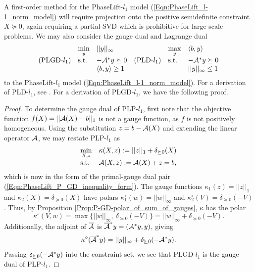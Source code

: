 A first-order method for the PhaseLift-$l_1$ model (\ref{Eqn:PhaseLift_l-1_norm_model}) will require projection onto the positive semidefinite constraint $X \succeq 0$, again requiring a partial SVD which is prohibitive for large-scale problems.  We may also consider the gauge dual and Lagrange dual
\begin{equation} 			\label{Eqn:PhaseLift_l-1_norm_model_dual}
\begin{array}{llllll}

	&	\min\limits_{y}
		&	||y||_\infty
			&&	\max\limits_y
				& \langle b, y \rangle
					\\
			
(\textnormal{PLGD-}l_1)		

	&	\textnormal{s.t.}
		&	-{\mathcal A}^*y \succeq 0
			&(\textnormal{PLD-}l_1)&	\textnormal{s.t.}
				&	- {\mathcal A}^*y \succeq 0
					\\
			
			&&	\langle b, y \rangle \geq 1 &&&	||y||_\infty \leq 1
\end{array}
\end{equation}
to the PhaseLift-$l_1$ model (\ref{Eqn:PhaseLift_l-1_norm_model}).
For a derivation of PLD-$l_1$, see \cite[Chapter 5]{boyd2004convex}.  For a derivation of PLGD-$l_1$, we have the following proof.

\begin{proof}
To determine the gauge dual of PLP-$l_1$, first note that the objective function $f(X) = ||{\mathcal A}(X) - b||_1$ is not a gauge function, as $f$ is not positively homogeneous.  Using the substitution $z = b - {\mathcal A}(X)$ and extending the linear operator ${\mathcal A}$, we may restate PLP-$l_1$ as
\begin{equation} 		\label{Eqn:PhaseLift_l-1_norm_model_general}
\begin{array}{ll}
\min\limits_{X, z}
	&	\kappa(X, z) := ||z||_1 + \delta_{\succeq 0}(X)
		\\
\textnormal{s.t.}
	&	\overline{{\mathcal A}}(X, z) := {\mathcal A}(X) + z = b,
\end{array}
\end{equation}
which is now in the form of the primal-gauge dual pair (\ref{Eqn:PhaseLift_P_GD_inequality_form}).  The gauge functions $\kappa_1(z) = ||z||_1$ and $\kappa_2(X) = \delta_{\succeq 0}(X)$ have polars $\kappa_1^\circ(w) = ||w||_\infty$ and $\kappa_2^\circ(V) = \delta_{\succeq 0}(-V)$.  Thus, by Proposition \ref{Prop:P-GD-polar_of_sum_of_gauges}, $\kappa$ has the polar
\begin{equation}
\kappa^\circ(V, w) = \max \{ ||w||_\infty, \ \delta_{\succeq 0}(-V) \} = ||w||_\infty + \delta_{\succeq 0}(-V).
\end{equation}
Additionally, the adjoint of $\overline{{\mathcal A}}$ is $\overline{{\mathcal A}}^*y = ({\mathcal A}^*y, y)$, giving
\begin{equation}
\kappa^\circ(\overline{{\mathcal A}}^*y) = ||y||_\infty + \delta_{\succeq 0}(-{\mathcal A}^*y).
\end{equation}
Passing $\delta_{\succeq 0}(-{\mathcal A}^*y)$ into the constraint set, we see that PLGD-$l_1$ is the gauge dual of PLP-$l_1$.

\end{proof}



